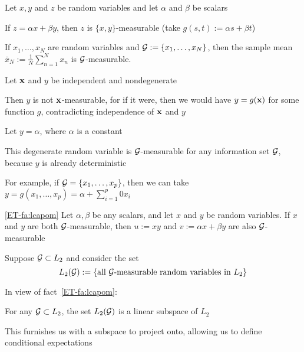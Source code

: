 \begin{frame}

    \vspace{2em}
    \Eg
    Let $x, y$ and $z$ be random variables and let $\alpha$ and $\beta$ be
    scalars
    
    If $z = \alpha x + \beta y$, then $z$ is
    $\{x, y\}$-measurable (take $g(s, t) := \alpha s + \beta t$)  

    \vspace{1em}
    \Eg
    If $x_1, \ldots, x_N$ are random variables
    and $\mathcal G := \{x_1, \ldots, x_N\}$, then the sample mean $\bar x_N :=
    \frac{1}{N} \sum_{n=1}^N x_n$ is $\mathcal G$-measurable.
\end{frame}

\begin{frame}

    \vspace{2em}
    \Eg
    Let ${\mathbf x}$ and $y$ be independent and nondegenerate
    
    Then $y$ is
    not ${\mathbf x}$-measurable, for if it were, then we would have $y =
    g({\mathbf x})$ for some function $g$, contradicting independence of ${\mathbf x}$
    and $y$
    
    \vspace{1em}
    \Eg
    Let $y = \alpha$, where $\alpha$ is a constant
    
    This degenerate random
    variable is $\mathcal G$-measurable for any information set $\mathcal G$, because $y$ is
    already deterministic
    
    For example, if $\mathcal G = \{x_1, \ldots, x_p\}$, then
    we can take $y = g(x_1, \ldots, x_p) = \alpha + \sum_{i=1}^p 0 x_i$  

\end{frame}

\begin{frame}

    \vspace{2em}
    \Fact\eqref{ET-fa:lcapom}
        Let $\alpha, \beta$ be any scalars, and let $x$ and $y$ be random
        variables.  If $x$ and $y$ are both $\mathcal G$-measurable, then $u := xy$ and
        $v := \alpha x + \beta y$ are also $\mathcal G$-measurable
    
    \vspace{1em}
    Suppose $\mathcal G \subset L_2$ and  consider the set
    \begin{equation*}
        L_2(\mathcal G) 
        := \{ \text{all $\mathcal G$-measurable random variables in } L_2 \}
    \end{equation*}
    
   
    In view of fact~\ref{ET-fa:lcapom}:

    \Fact
        For any $\mathcal G \subset L_2$, the set $L_2(\mathcal G)$ is a linear subspace of $L_2$
    
    This furnishes us with a subspace to project onto, allowing us to define
    conditional expectations
    
\end{frame}


